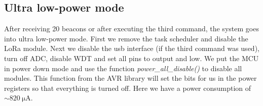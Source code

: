 \documentclass{scrartcl}
\begin{document}
\subsection{Ultra low-power mode}
After receiving 20 beacons or after executing the third command, the system goes into ultra low-power mode.
First we remove the task scheduler and disable the LoRa module.
Next we disable the usb interface (if the third command was used), turn off ADC, disable WDT and set all pins to output and low.
We put the MCU in power down mode and use the function \textit{power\_all\_disable()} to disable all modules.
This function from the AVR library will set the bits for us in the power registers so that everything is turned off.
Here we have a power consumption of $\sim \SI{820}{\micro\ampere}$.
\end{document}
